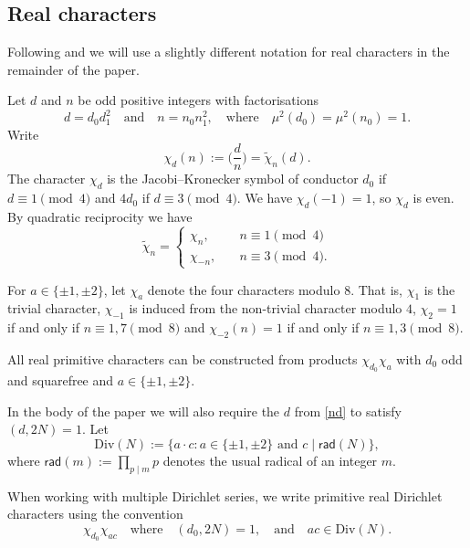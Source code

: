 \documentclass[12pt,reqno]{amsart}
\theoremstyle{plain}
\theoremstyle{remark}
\numberwithin{equation}{section}
\numberwithin{lemma}{section}
\numberwithin{theorem}{section}
\numberwithin{prop}{section}
\numberwithin{remark}{section}
\begin{document}
\subsection{Real characters}
Following \cite{DGH} and \cite{Blo} we will use a slightly different notation for 
real characters in the remainder of the paper. 

Let $d$ and $n$ be odd positive integers with factorisations
\begin{equation} \label{nd}
d=d_0 d_1^2 \quad \text{and} \quad n=n_0 n_1^2, \quad \text{where} \quad  \mu^2(d_0)=\mu^2(n_0)=1.
\end{equation}
Write 
 \begin{equation*}
 \chi_d(n):=\Big( \frac{d}{n}  \Big)=\widetilde{\chi}_n(d).
 \end{equation*}
 The character $\chi_d$ is the Jacobi--Kronecker symbol of conductor $d_0$ if
 $d \equiv 1 \pmod{4}$ and $4d_0$ if $d \equiv 3 \pmod{4}$. We have $\chi_{d}(-1)=1$, so $\chi_d$ is even.
  By quadratic reciprocity 
 we have 
 \begin{equation} \label{quadrep}
 \widetilde{\chi}_n=\begin{cases}
 \chi_n, & \quad n \equiv 1 \pmod{4} \\
 \chi_{-n}, & \quad n \equiv 3 \pmod{4}.
 \end{cases}
 \end{equation}
  
 For $a \in \{\pm 1, \pm 2\}$, let $\chi_a$ denote the four characters modulo $8$.
That is,
$\chi_1$ is the trivial character, $\chi_{-1}$ is induced from the 
non-trivial character modulo $4$,
$\chi_2=1$ if and only if $n \equiv 1,7 \pmod{8}$ and $\chi_{-2}(n)=1$ if and only if 
$n \equiv 1,3 \pmod{8}$. 

All real primitive characters can be constructed from products $\chi_{d_0} \chi_{a}$
with $d_0$ odd and squarefree and $a \in \{ \pm 1, \pm 2 \}$.

In the body of the paper we will also 
require the $d$ from \eqref{nd} to satisfy $(d,2N)=1$. 
Let 
\begin{equation*}
\text{Div}(N):=\{a \cdot c : a \in \{\pm 1, \pm 2 \}  \text{ and } c \mid \mathsf{rad}(N) \},
\end{equation*}
where $\mathsf{rad}(m):=\prod_{p \mid m} p$ 
denotes the usual radical of an integer $m$.

When working with multiple Dirichlet series,
we write primitive real Dirichlet characters using 
the convention
\begin{equation} \label{dircond}
\chi_{d_0} \chi_{ac} \quad \text{where}  \quad (d_0,2N)=1, \quad \text{and} \quad
ac \in \text{Div}(N).
\end{equation}
\end{document}
